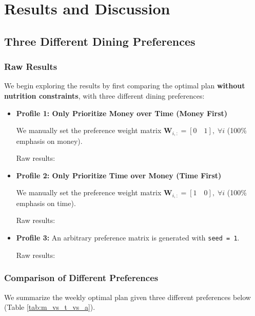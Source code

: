 \documentclass{article}
\newcommand{\bd}[1]{\mathbf{#1}}
\begin{document}
\section{Results and Discussion}


\subsection{Three Different Dining Preferences}
\subsubsection{Raw Results}
We begin exploring the results by first comparing the optimal plan \textbf{without nutrition constraints}, with three different dining preferences:

\begin{itemize}
    \item \textbf{Profile 1: Only Prioritize Money over Time (Money First)}

    We manually set the preference weight matrix $\bd{W}_{i,:} = [0 \quad 1], \; \forall i$ (100\% emphasis on money).
    
    Raw results:

    
    
    \item \textbf{Profile 2: Only Prioritize Time over Money (Time First)}

    We manually set the  preference weight matrix $\bd{W}_{i,:} = [1 \quad 0], \; \forall i$ (100\% emphasis on time).
    
    Raw results:
    

    \item \textbf{Profile 3: }An arbitrary preference matrix is generated with \texttt{seed = 1}. 
    
    Raw results:
    
    
\end{itemize}

\subsubsection{Comparison of Different Preferences}
We summarize the weekly optimal plan given three different preferences below (Table \ref{tab:m_vs_t_vs_a}).




\end{document}
